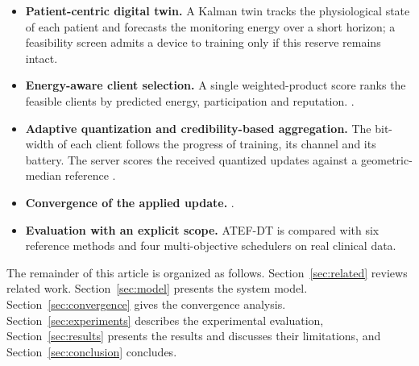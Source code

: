 \begin{itemize}
	\item \textbf{Patient-centric digital twin.} A Kalman twin tracks the physiological state of each patient and forecasts the monitoring energy over a short horizon; a feasibility screen admits a device to training only if this reserve remains intact.
	\item \textbf{Energy-aware client selection.} A single weighted-product score ranks the feasible clients by predicted energy, participation and reputation. .
	\item \textbf{Adaptive quantization and credibility-based aggregation.} The bit-width of each client follows the progress of training, its channel and its battery. The server scores the received quantized updates against a geometric-median reference .
	\item \textbf{Convergence of the applied update.} .
	\item \textbf{Evaluation with an explicit scope.} ATEF-DT is compared with six reference methods and four multi-objective schedulers on real clinical data. 
\end{itemize}


The remainder of this article is organized as follows. Section~\ref{sec:related} reviews related work. Section~\ref{sec:model} presents the system model. Section~\ref{sec:convergence} gives the convergence analysis. Section~\ref{sec:experiments} describes the experimental evaluation, Section~\ref{sec:results} presents the results and discusses their limitations, and Section~\ref{sec:conclusion} concludes.
